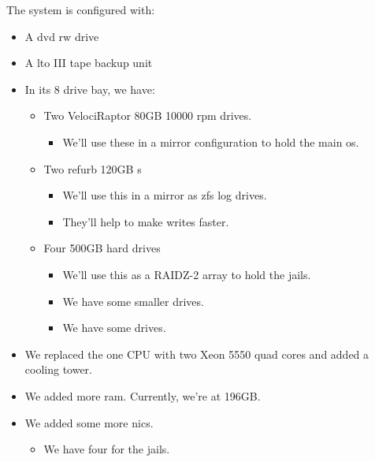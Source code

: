 The system is configured with:
\begin{itemize}
	\item A \gls{dvd} \gls{rw} drive
    	\item A  \gls{lto} III tape \gls{backup} unit
    	\item In its 8 drive bay, we have:
	\begin{itemize}
		\item Two VelociRaptor 80GB 10000 rpm drives.
		\begin{itemize}
			\item We'll use these in a \Gls{mirror} \gls{configuration} to hold the main \gls{os}.
		\end{itemize}
		\item Two refurb 120GB s
		\begin{itemize}
			\item We'll use this in a \Gls{mirror} as \gls{zfs} log drives.
			\item They'll help to make writes faster.
		\end{itemize}
		\item Four 500GB hard drives
		\begin{itemize}
			\item We'll use this as a RAIDZ-2 array to hold the \glspl{jail}.
			\item We have some smaller  drives.
			\item We have some  drives.
		\end{itemize}
		\end{itemize}
		\item We replaced the one CPU with two Xeon 5550 quad cores and added a cooling tower.
		\item We added more \gls{ram}.  Currently, we're at 196GB.
		\item We added some more \gls{nic}s.
		\begin{itemize}
			\item We have four for the jails.

\end{itemize}
\end{itemize}
